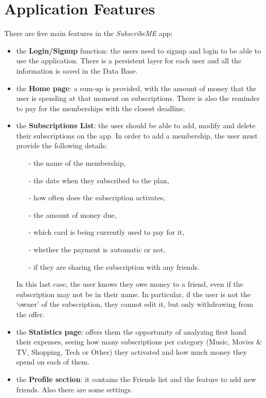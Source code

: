 \documentclass[11pt]{article}
\begin{document}
\newpage
\section{Application Features}\label{sec:features}
There are five main features in the \textit{SubscribeME} app:
\begin{itemize}
    \item the \textbf{Login/Signup} function: the users need to signup and login to be able to use the application. There is a persistent layer for each user and all the information is saved in the Data Base.
    \item the \textbf{Home page}: a sum-up is provided, with the amount of money that the user is spending at that moment on subscriptions. There is also the reminder to pay for the memberships with the closest deadline.
    \item the \textbf{Subscriptions List}: the user should be able to add, modify and delete their subscriptions on the app.
          In order to add a membership, the user must provide the following details:
          \begin{itemize}
              \item[-] the name of the membership,
              \item[-] the date when they subscribed to the plan,
              \item[-] how often does the subscription activates,
              \item[-] the amount of money due,
              \item[-] which card is being currently used to pay for it,
              \item[-] whether the payment is automatic or not,
              \item[-] if they are sharing the subscription with any friends.
          \end{itemize}
          In this last case, the user knows they owe money to a friend, even if the subscription may not be in their name. In particular, if the user is not the `owner' of the subscription, they cannot edit it, but only withdrawing from the offer.
    \item the \textbf{Statistics page}: offers them the opportunity of analyzing first hand their expenses, seeing how many subscriptions per category (Music, Movies \& TV, Shopping, Tech or Other) they activated and how much money they spend on each of them.
    \item the \textbf{Profile section}: it contains the Friends list and the feature to add new friends. Also there are some settings.
\end{itemize}
\end{document}
